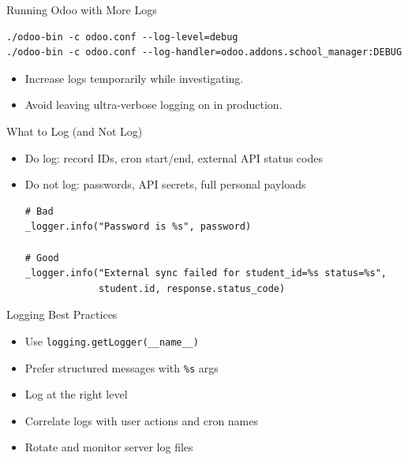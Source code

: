 \begin{frame}[fragile]{Running Odoo with More Logs}
\begin{lstlisting}[style=bash]
./odoo-bin -c odoo.conf --log-level=debug
./odoo-bin -c odoo.conf --log-handler=odoo.addons.school_manager:DEBUG
\end{lstlisting}
	\begin{itemize}
		\item Increase logs temporarily while investigating.
		\item Avoid leaving ultra-verbose logging on in production.
	\end{itemize}
\end{frame}

\begin{frame}[fragile]{What to Log (and Not Log)}
	\begin{itemize}
		\item Do log: record IDs, cron start/end, external API status codes
		\item Do not log: passwords, API secrets, full personal payloads
\begin{lstlisting}
# Bad
_logger.info("Password is %s", password)

# Good
_logger.info("External sync failed for student_id=%s status=%s",
			 student.id, response.status_code)
\end{lstlisting}
	\end{itemize}
\end{frame}

\begin{frame}{Logging Best Practices}
	\begin{itemize}
		\item Use \texttt{logging.getLogger(\_\_name\_\_)}
		\item Prefer structured messages with \texttt{\%s} args
		\item Log at the right level
		\item Correlate logs with user actions and cron names
		\item Rotate and monitor server log files
	\end{itemize}
\end{frame}
